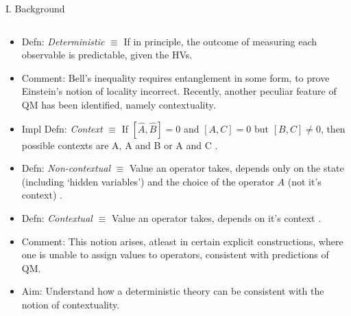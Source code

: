 \documentclass[final,hyperref={pdfpagelabels=false}]{beamer}
\begin{document}
\begin{frame}[t]
\begin{columns}[c]
\begin{column}{.31\textwidth}
\begin{block}{I. Background}
\begin{columns}
\begin{column}{0.7\textwidth}
\begin{itemize}
            \item Defn: \emph{Deterministic} $\equiv$ If in principle, the outcome of measuring each observable is predictable, given the HVs. %

            \item Comment: Bell's inequality requires entanglement in some form, to prove Einstein's notion of locality incorrect. Recently, another peculiar feature of QM has been identified, namely contextuality. 

            \item Impl Defn: \emph{Context} $\equiv$ If $[\hat A,\hat B]=0$ and $[A,C]=0$ but $[B,C]\neq 0$, then possible contexts are {A}, {A and B} or {A and C} \cite{peresBook}.

            \item Defn: \emph{Non-contextual} $\equiv$ Value an operator takes, depends only on the state (including `hidden variables') and the choice of the operator $A$ (not it's context) \cite{peresBook}.

            \item Defn: \emph{Contextual} $\equiv$ Value an operator takes, depends on it's context \cite{peresBook}.

            \item Comment: This notion arises, atleast in certain explicit constructions, where one is unable to assign values to operators, consistent with predictions of QM.

            \item Aim: Understand how a deterministic theory can be consistent with the notion of contextuality.

            \end{itemize}
          \end{column}


\end{columns}
\end{block}
\end{column}
\end{columns}
\end{frame}
\end{document}
